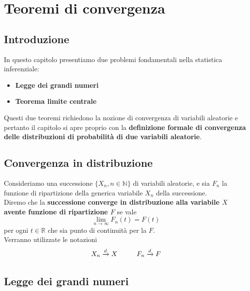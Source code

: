 \chapter[Teoremi di convergenza]{Teoremi di convergenza}

\section{Introduzione}
In questo capitolo presentiamo due problemi fondamentali nella statistica inferenziale:
\begin{itemize}
	\item \textbf{Legge dei grandi numeri}
	\item \textbf{Teorema limite centrale}
\end{itemize}
Questi due teoremi richiedono la nozione di convergenza di variabili aleatorie e pertanto il capitolo si apre proprio con la \textbf{definizione formale di convergenza delle distribuzioni di probabilità di due variabili aleatorie}.

\section{Convergenza in distribuzione}
Consideriamo una successione \(\{X_n, n \in \mathbb{N} \}\) di variabili aleatorie, e sia $F_n$ la funzione di ripartizione della generica variabile $X_n$ della successione.\\
Diremo che la \textbf{successione converge in distribuzione alla variabile $X$ avente funzione di ripartizione $F$ }se vale
\begin{equation}
	\lim_{n \to \infty} F_n(t) = F(t)
\end{equation}
per ogni $t \in \mathbb{R}$ che sia punto di continuità per la $F$.\\
Verranno utilizzate le notazioni
\[
X_n  \xrightarrow{d} X \hspace{10mm} F_n \xrightarrow{d} F 
\]

\section{Legge dei grandi numeri}
